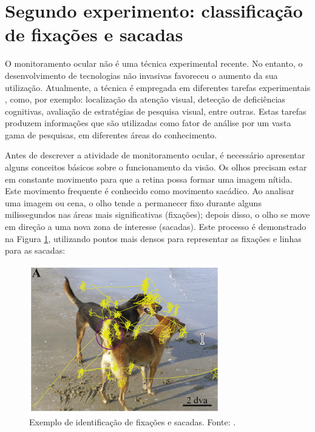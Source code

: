 \documentclass[msc, classic, a4paper]{ufbathesis}
\begin{document}
\section{Segundo experimento: classificação de fixações e sacadas}


O monitoramento ocular não é uma técnica experimental recente.
No entanto, o desenvolvimento de tecnologias não invasivas favoreceu o aumento da sua utilização.
Atualmente, a técnica é empregada em diferentes tarefas experimentais \cite{Duchowski_EyeTrackingSurvey}, como, por exemplo:
localização da atenção visual,
detecção de deficiências cognitivas,
avaliação de estratégias de pesquisa visual, entre outras.
Estas tarefas produzem informações que são utilizadas como fator de análise por um vasta gama de pesquisas, em diferentes áreas do conhecimento.

Antes de descrever a atividade de monitoramento ocular, é necessário apresentar alguns conceitos básicos sobre o funcionamento da visão.
Os olhos precisam estar em constante movimento para que a retina possa formar uma imagem nítida.
Este movimento frequente é conhecido como movimento sacádico.
Ao analisar uma imagem ou cena, o olho tende a permanecer fixo durante alguns milissegundos nas áreas mais significativas (fixações);
depois disso, o olho se move em direção a uma nova zona de interesse (sacadas).
Este processo é demonstrado na Figura \ref{fig:exemplo_fixacoes_e_sacadas}, utilizando pontos mais densos para representar as fixações e linhas para as sacadas:

\begin{figure}[H]
    \begin{center}
        \includegraphics[scale=1]{imagens/exemplo_fixacao_e_sacadas.png}
        \caption{Exemplo de identificação de fixações e sacadas. Fonte: .}
        \label{fig:exemplo_fixacoes_e_sacadas}
    \end{center}
\end{figure}
\end{document}
